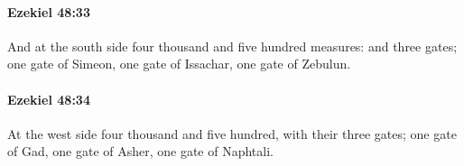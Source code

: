 		\paragraph{Ezekiel 48:33} %
			\label{EZEKIEL-48-33}

			And at the south side four thousand and five hundred measures: and three gates; one gate of Simeon, one gate of Issachar, one gate of Zebulun.


		\paragraph{Ezekiel 48:34} %
			\label{EZEKIEL-48-34}

			At the west side four thousand and five hundred, with their three gates; one gate of Gad, one gate of Asher, one gate of Naphtali.


